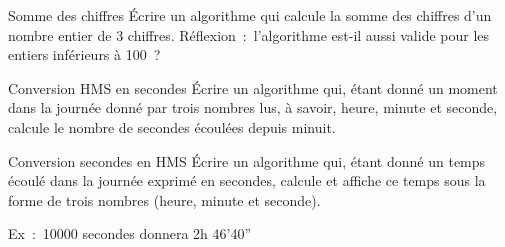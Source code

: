 \begin{Exercice}{Somme des chiffres}
	Écrire un algorithme qui calcule la somme des chiffres
	d’un nombre entier de 3 chiffres.
	Réflexion~:~l’algorithme est-il aussi valide pour les entiers inférieurs
	à 100~?
\end{Exercice}

\begin{Exercice}{Conversion HMS en secondes}
	Écrire un algorithme qui, étant donné un moment dans la journée donné
	par trois nombres lus, à savoir, heure, minute et seconde, calcule le
	nombre de secondes écoulées depuis minuit.
\end{Exercice}

\begin{Exercice}{Conversion secondes en HMS}
	Écrire un algorithme qui, étant donné un temps écoulé dans la journée
	exprimé en secondes, calcule et affiche ce temps sous la forme de trois
	nombres (heure, minute et seconde).

	Ex~:~10000 secondes donnera 2h 46'40''
\end{Exercice}
